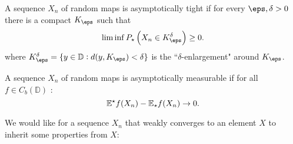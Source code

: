  \begin{definition}
	\label{def:asymptotically-tight}
	A sequence \(X_n\) of random maps is asymptotically tight if for every  \(\eps,\delta>0\) there is a compact \(K_\eps\) such that 
	 \[
	    \lim\inf P_\star\left(X_n \in K_\eps^\delta\right) \geq 0
	.\]
	where \(K_\eps^\delta = \{y\in\mathbb{D}:d(y,K_\eps) < \delta\}\) is the ``\(\delta\)-enlargement" around \(K_\eps\). 
\end{definition}
\begin{definition}
	\label{def:asymptotically-measurable}
	A sequence \(X_n\) of random maps is asymptotically measurable if for all  \(f \in C_b(\mathbb{D})\) :
	\[
		\mathbb{E}^\star f(X_n) - \mathbb{E}_\star f(X_n) \to 0
	.\] 
\end{definition}

We would like for a sequence \(X_n\) that weakly converges to an element  \(X\) to inherit some properties from  \(X\):


